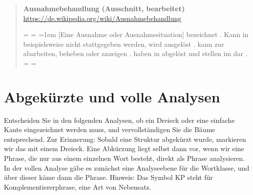 \begin{quote}\onehalfspacing
   \textbf{Ausnahmebehandlung (Ausschnitt, bearbeitet)}\\
   {\footnotesize\url{https://de.wikipedia.org/wiki/Ausnahmebehandlung}}\\
  \begin{linenumbers}
  \newdimen\origiwspc%
  \newdimen\origiwstr%
  \origiwspc=\font
  \origiwstr=\font
  \font=1em
  {[Eine Ausnahme oder Ausnahmesituation]} bezeichnet   .
  Kann in  beispielsweise  nicht stattgegeben werden, wird  ausgelöst .
   kann zur   abarbeiten,   beheben oder anzeigen .
   haben in   abgelöst und stellen im   dar .
  \font=\origiwspc
  \font=\origiwstr
  \end{linenumbers}
\end{quote}

\Halbzeile



\section{Abgekürzte und volle Analysen}

Entscheiden Sie in den folgenden Analysen, ob ein Dreieck oder eine einfache Kante eingezeichnet werden muss, und vervollständigen Sie die Bäume entsprechend.
Zur Erinnerung: Sobald eine Struktur abgekürzt wurde, markieren wir das mit einem Dreieck.
Eine Abkürzung liegt selbst dann vor, wenn wir eine Phrase, die nur aus einem einzelnen Wort besteht, direkt als Phrase analysieren.
In der vollen Analyse gäbe es zunächst eine Analyseebene für die Wortklasse, und über dieser käme dann die Phrase.
Hinweis: Das Symbol KP steht für Komplementiererphrase, eine Art von Nebensatz.

